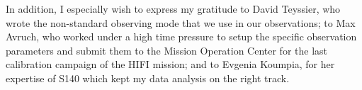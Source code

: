 In addition, I especially wish to express my gratitude to David Teyssier, who wrote the non-standard observing mode that we use in our observations;
to Max Avruch, who worked under a high time pressure to setup the specific observation parameters and submit them to the Mission Operation Center for the last calibration campaign of the HIFI mission;
and to Evgenia Koumpia, for her expertise of S140 which kept my data analysis on the right track.
